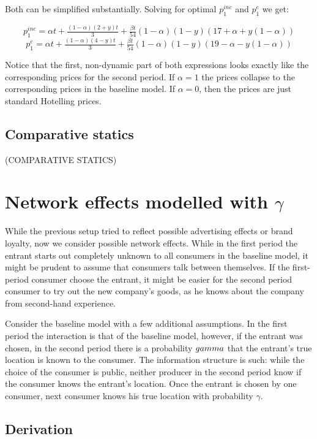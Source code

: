 \documentclass{article}
\begin{document}
Both can be simplified substantially. Solving for optimal $p^{inc}_1$ and $p^{e}_1$ we get:

$$p^{inc}_1 = \alpha t + \tfrac{(1-\alpha)(2+y)t}{3} + \tfrac{\beta t}{54}(1-\alpha)(1-y)(17+ \alpha +y(1-\alpha))$$
$$p^{e}_1 = \alpha t + \tfrac{(1-\alpha)(4-y)t}{3} + \tfrac{\beta t}{54}(1-\alpha)(1-y)(19 - \alpha -y(1-\alpha))$$

Notice that the first, non-dynamic part of both expressions looks exactly like the corresponding prices for the second period. If $\alpha=1$ the prices collapse to the corresponding prices in the baseline model. If $\alpha=0$, then the prices are just standard Hotelling prices.

\subsection{Comparative statics}

(COMPARATIVE STATICS)

\section{Network effects modelled with $\gamma$}

While the previous setup tried to reflect possible advertising effects or brand loyalty, now we consider possible network effects. While in the first period the entrant starts out completely unknown to all consumers in the baseline model, it might be prudent to assume that consumers talk between themselves. If the first-period consumer choose the entrant, it might be easier for the second period consumer to try out the new company's goods, as he knows about the company from second-hand experience.

Consider the baseline model with a few additional assumptions. In the first period the interaction is that of the baseline model, however, if the entrant was chosen, in the second period there is a probability $\\gamma$ that the entrant's true location is known to the consumer. The information structure is such: while the choice of the consumer is public, neither producer in the second period know if the consumer knows the entrant's location. Once the entrant is chosen by one consumer, next consumer knows his true location with probability $\gamma$.

\subsection{Derivation}
\end{document}
